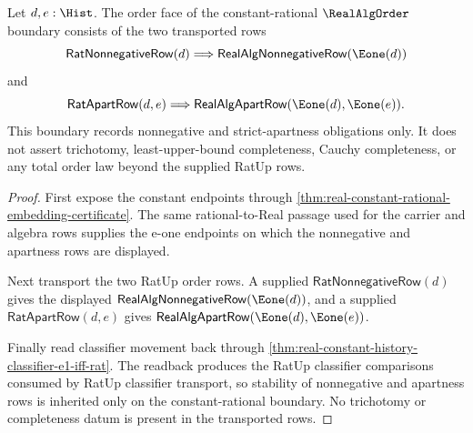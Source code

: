\begin{theorem}
\label{thm:realalgorder-constant-order-apartness-obligations}
Let $d,e:\Hist$. The order face of the constant-rational $\RealAlgOrder$
boundary consists of the two transported rows
$$
\mathsf{RatNonnegativeRow}(d)
\Longrightarrow
\mathsf{RealAlgNonnegativeRow}(\Eone(d))
$$
and
$$
\mathsf{RatApartRow}(d,e)
\Longrightarrow
\mathsf{RealAlgApartRow}(\Eone(d),\Eone(e)).
$$
This boundary records nonnegative and strict-apartness obligations only. It
does not assert trichotomy, least-upper-bound completeness, Cauchy
completeness, or any total order law beyond the supplied RatUp rows.
\end{theorem}
\begin{proof}
First expose the constant endpoints through
\autoref{thm:real-constant-rational-embedding-certificate}. The same
rational-to-Real passage used for the carrier and algebra rows supplies the
e-one endpoints on which the nonnegative and apartness rows are displayed.

Next transport the two RatUp order rows. A supplied
$\mathsf{RatNonnegativeRow}(d)$ gives the displayed
$\mathsf{RealAlgNonnegativeRow}(\Eone(d))$, and a supplied
$\mathsf{RatApartRow}(d,e)$ gives
$\mathsf{RealAlgApartRow}(\Eone(d),\Eone(e))$.

Finally read classifier movement back through
\autoref{thm:real-constant-history-classifier-e1-iff-rat}. The readback
produces the RatUp classifier comparisons consumed by RatUp classifier
transport, so stability of nonnegative and apartness rows is inherited only on
the constant-rational boundary. No trichotomy or completeness datum is present
in the transported rows.
\end{proof}

